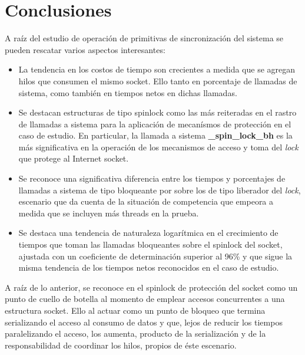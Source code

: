 \section{Conclusiones}
A raíz del estudio de operación de primitivas de sincronización del sistema se pueden rescatar varios aspectos interesantes:
\begin{itemize}
\item La tendencia en los costos de tiempo son crecientes a medida que se agregan hilos que consumen el mismo socket. Ello tanto en porcentaje de llamadas de sistema, como también en tiempos netos en dichas llamadas.
\item Se destacan estructuras de tipo spinlock como las más reiteradas en el rastro de llamadas a sistema para la aplicación de mecanísmos de protección en el caso de estudio. En particular, la llamada a sistema \textbf{\_spin\_lock\_bh} es la más significativa en la operación de los mecanismos de acceso y toma del \emph{lock} que protege al Internet socket.
\item Se reconoce una significativa diferencia entre los tiempos y porcentajes de llamadas a sistema de tipo bloqueante por sobre los de tipo liberador del \emph{lock}, escenario que da cuenta de la situación de competencia que empeora a medida que se incluyen más threads en la prueba.
\item Se destaca una tendencia de naturaleza logarítmica en el crecimiento de tiempos que toman las llamadas bloqueantes sobre el spinlock del socket, ajustada con un coeficiente de determinación superior al 96\% y que sigue la misma tendencia de los tiempos netos reconocidos en el caso de estudio.
\end{itemize}
A raíz de lo anterior, se reconoce en el spinlock de protección del socket como un punto de cuello de botella al momento de emplear accesos concurrentes a una estructura socket. Ello al actuar como un punto de bloqueo que termina serializando el acceso al consumo de datos y que, lejos de reducir los tiempos paralelizando el acceso, los aumenta, producto de la serialización y de la responsabilidad de coordinar los hilos, propios de éste escenario.